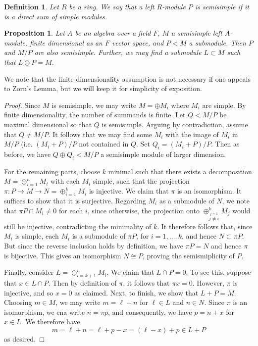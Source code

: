 \documentclass[12pt]{report}
\theoremstyle{plain}
\newtheorem{defn}[thm]{Definition}
\newtheorem{prop}[thm]{Proposition}
\newcommand{\X}[1]{#1\index{#1}}
\begin{document}
\begin{defn} 
Let $R$ be a ring. We say that a left $R$-module $P$ is \X{semisimple} if it is
a direct sum of simple modules.
\end{defn}

\begin{prop} \label{semisimple sub quot}
Let $A$ be an algebra over a field $F$, $M$ a semisimple left $A$-module,
finite dimensional as an $F$ vector space, and $P < M$ a submodule. Then
$P$ and $M/P$ are also semisimple. Further, we may find a submodule $L
\subset M$ such that $L \oplus P = M$.
\end{prop}
We note that the finite dimensionality assumption is not necessary if one
appeals to Zorn's Lemma, but we will keep it for simplicity of exposition.
\begin{proof}
Since $M$ is semisimple, we may write $M = \oplus M_i$ where $M_i$ are
simple. By finite dimensionality, the number of summands is finite.  Let $Q
< M/P$ be maximal dimensional so that $Q$ is semisimple. Arguing by
contradiction, assume that $Q \neq M/P$. It follows that we may find some
$M_i$ with the image of $M_i$ in $M/P$ (i.e.  $(M_i + P)/P$ not contained
in $Q$. Set $Q_i = (M_i + P)/P$. Then as before, we have $Q \oplus Q_i <
M/P$ a semisimple module of larger dimension.

For the remaining parts, choose $k$ minimal such that there exists a
decomposition $M = \oplus_{i = 1}^n M_i$ with each $M_i$ simple, such that the
projection $\pi: P \to M \to N = \oplus_{i = 1}^k M_i$ is injective. We claim
that $\pi$ is an isomorphism. It suffices to show that it is surjective.
Regarding $M_i$ as a submodule of $N$, we note that $\pi P \cap M_i \neq 0$
for each $i$, since otherwise, the projection onto $\oplus_{\stackrel{j =
1}{j \neq i}}^k M_j$ would still be injective, contradicting the minimality
of $k$. It therefore follows that, since $M_i$ is simple, each $M_i$ is a
submodule of $\pi P$, for $i = 1, \ldots, k$, and hence $N \subset \pi P$.
But since the reverse inclusion holds by definition, we have $\pi P = N$
and hence $\pi$ is bijective. This gives an isomorphism $N \cong P$,
proving the semismiplicity of $P$.

Finally, consider $L = \oplus_{i = k+1}^n M_i$. We claim that $L \cap P =
0$. To see this, suppose that $x \in L \cap P$. Then by
definition of $\pi$, it follows that $\pi x = 0$. However, $\pi$ is
injective, and so $x = 0$ as claimed. Next, to finish, we show that $L
+ P = M$. Choosing $m \in M$, we may write $m = \ell + n$ for $\ell \in L$
and $n \in N$. Since $\pi$ is an isomorphism, we cna write $n = \pi p$, and
consequently, we have $p = n + x$ for $x \in L$. We therefore have
\[m = \ell + n = \ell + p - x = (\ell - x) + p \in L + P\]
as desired.
\end{proof}
\end{document}
